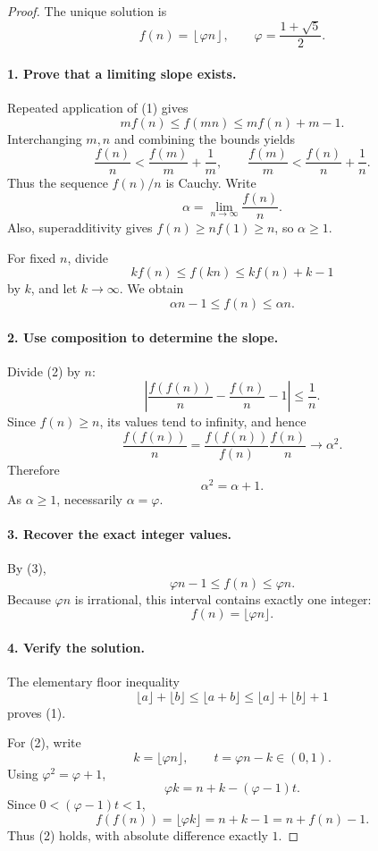 
\begin{dlsummary}[title={\bfseries Solution 50. The Golden Staircase},breakable]

\begin{proof}
The unique solution is
\[
\boxed{
f(n)=\left\lfloor\varphi n\right\rfloor,
\qquad
\varphi=\frac{1+\sqrt5}{2}.
}
\]

\paragraph{1. Prove that a limiting slope exists.}

Repeated application of (1) gives
\[
m f(n)\le f(mn)\le m f(n)+m-1.
\]
Interchanging \(m,n\) and combining the bounds yields
\[
\frac{f(n)}n<\frac{f(m)}m+\frac1m,
\qquad
\frac{f(m)}m<\frac{f(n)}n+\frac1n.
\]
Thus the sequence \(f(n)/n\) is Cauchy. Write
\[
\alpha=\lim_{n\to\infty}\frac{f(n)}n.
\]
Also, superadditivity gives \(f(n)\ge n f(1)\ge n\), so \(\alpha\ge1\).

For fixed \(n\), divide
\[
k f(n)\le f(kn)\le k f(n)+k-1
\]
by \(k\), and let \(k\to\infty\). We obtain
\[
\boxed{\alpha n-1\le f(n)\le\alpha n.} \tag{3}
\]

\paragraph{2. Use composition to determine the slope.}

Divide (2) by \(n\):
\[
\left|
\frac{f(f(n))}{n}-\frac{f(n)}n-1
\right|\le\frac1n.
\]
Since \(f(n)\ge n\), its values tend to infinity, and hence
\[
\frac{f(f(n))}{n}
=
\frac{f(f(n))}{f(n)}\frac{f(n)}n
\longrightarrow\alpha^2.
\]
Therefore
\[
\alpha^2=\alpha+1.
\]
As \(\alpha\ge1\), necessarily \(\alpha=\varphi\).

\paragraph{3. Recover the exact integer values.}

By (3),
\[
\varphi n-1\le f(n)\le\varphi n.
\]
Because \(\varphi n\) is irrational, this interval contains exactly one integer:
\[
f(n)=\lfloor\varphi n\rfloor.
\]

\paragraph{4. Verify the solution.}

The elementary floor inequality
\[
\lfloor a\rfloor+\lfloor b\rfloor
\le\lfloor a+b\rfloor
\le\lfloor a\rfloor+\lfloor b\rfloor+1
\]
proves (1).

For (2), write
\[
k=\lfloor\varphi n\rfloor,
\qquad
t=\varphi n-k\in(0,1).
\]
Using \(\varphi^2=\varphi+1\),
\[
\varphi k
=n+k-(\varphi-1)t.
\]
Since \(0<(\varphi-1)t<1\),
\[
f(f(n))=\lfloor\varphi k\rfloor=n+k-1=n+f(n)-1.
\]
Thus (2) holds, with absolute difference exactly \(1\).
\end{proof}
\end{dlsummary}

